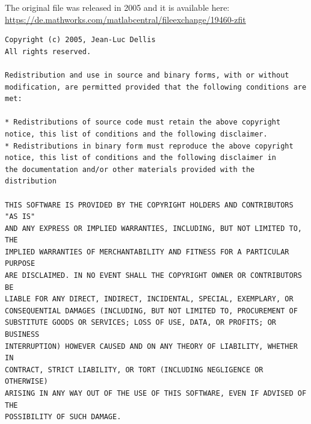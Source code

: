 \documentclass[10pt,a4paper,oneside]{book}
\begin{document}
The original file was released in 2005 and it is available here:\\

\url{https://de.mathworks.com/matlabcentral/fileexchange/19460-zfit}

\begin{verbatim}
Copyright (c) 2005, Jean-Luc Dellis
All rights reserved.

Redistribution and use in source and binary forms, with or without
modification, are permitted provided that the following conditions are
met:

* Redistributions of source code must retain the above copyright
notice, this list of conditions and the following disclaimer.
* Redistributions in binary form must reproduce the above copyright
notice, this list of conditions and the following disclaimer in
the documentation and/or other materials provided with the distribution

THIS SOFTWARE IS PROVIDED BY THE COPYRIGHT HOLDERS AND CONTRIBUTORS "AS IS"
AND ANY EXPRESS OR IMPLIED WARRANTIES, INCLUDING, BUT NOT LIMITED TO, THE
IMPLIED WARRANTIES OF MERCHANTABILITY AND FITNESS FOR A PARTICULAR PURPOSE
ARE DISCLAIMED. IN NO EVENT SHALL THE COPYRIGHT OWNER OR CONTRIBUTORS BE
LIABLE FOR ANY DIRECT, INDIRECT, INCIDENTAL, SPECIAL, EXEMPLARY, OR
CONSEQUENTIAL DAMAGES (INCLUDING, BUT NOT LIMITED TO, PROCUREMENT OF
SUBSTITUTE GOODS OR SERVICES; LOSS OF USE, DATA, OR PROFITS; OR BUSINESS
INTERRUPTION) HOWEVER CAUSED AND ON ANY THEORY OF LIABILITY, WHETHER IN
CONTRACT, STRICT LIABILITY, OR TORT (INCLUDING NEGLIGENCE OR OTHERWISE)
ARISING IN ANY WAY OUT OF THE USE OF THIS SOFTWARE, EVEN IF ADVISED OF THE
POSSIBILITY OF SUCH DAMAGE.
\end{verbatim}
\end{document}
